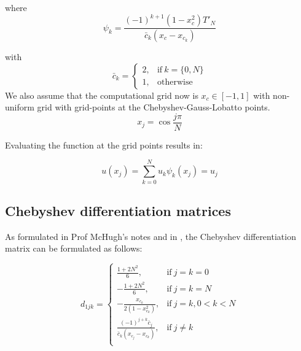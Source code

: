 \documentclass{article}
\begin{document}
where $$\psi_{k} = \frac{(-1)^{k+1}(1-x_{c}^{2})T'_{N}}{\bar{c}_{k} (x_{c}-x_{c_{k}})} $$

with $$\bar{c}_{k} =
    \begin{cases}
      2, & \text{if}\ k=\{0, N\} \\
      1, & \text{otherwise}
    \end{cases}$$
We also assume that the computational grid now is $x_{c} \in [-1, 1]$ with non-uniform grid with grid-points at the Chebyshev-Gauss-Lobatto points.
\begin{equation*}
 x_{j} = \cos{\frac{j \pi}{N}}
\end{equation*}

Evaluating the function at the grid points results in:

\begin{equation*}
 u(x_{j}) = \sum_{k=0}^{N} u_{k}\psi_{k}(x_{j}) = u_{j}
\end{equation*}

\subsection{Chebyshev differentiation matrices}
As formulated in Prof McHugh's notes and in \cite{trefethen2000spectral}, the Chebyshev differentiation matrix can be formulated as follows:

\begin{equation}
 d_{1jk} = \begin{cases}
      \frac{1+2N^{2}}{6}, & \text{if}\ j = k = 0 \\
      -\frac{1+2N^{2}}{6}, & \text{if}\ j = k = N\\
      -\frac{x_{c_{k}}}{2(1-x_{c_{k}}^{2})}, & \text{if}\ j = k, 0 < k < N \\
      \frac{(-1)^{j+k}\bar{c}_{j} }{\bar{c}_{k}(x_{c_{j}} - x_{c_{k}})}, & \text{if}\ j \neq k \\
    \end{cases}
\end{equation}
\end{document}
